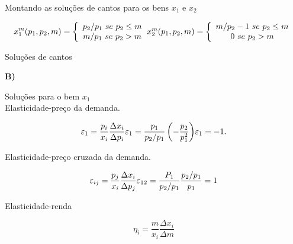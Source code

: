 \begin{flushleft}
\begin{center}
Montando as soluções de cantos para os bens $x_{1}$ e $x_{2}$
\end{center}

\begin{equation}
x_{1}^m(p_{1},p_{2},m) = \left\{
\begin{array}{cc}
p_{2}/p_{1} \ se \ p_{2} \leq m \\
m/p_{1} \ se \ p_{2} > m
\end{array}
\right.
$$\\$$
x_{2}^m(p_{1},p_{2},m) = \left\{
\begin{array}{cc}
m/p_{2} - 1 \ se \ p_{2} \leq m \\
0 \ se \ p_{2} > m
\end{array}
\right.
\end{equation}

\begin{center}
Soluções de cantos
\end{center}
\singlespacing

\textbf{B)} 
\singlespacing

\begin{center}
	Soluções para o bem $x_{1}$
	\\
	Elasticidade-preço da demanda.
\end{center}

\begin{equation}
\varepsilon_{1} = \dfrac{p_{i}}{x_{i}} \dfrac{ \Delta x_{i}}{\Delta p_{i}}
$$\\$$
\varepsilon_{1} = \dfrac{p_{1}}{p_{2}/p_{1}} \left(- \dfrac{p_{2}}{p_{1}^2} \right)
$$\\$$
\varepsilon_{1} = -1.
\end{equation}

\begin{center}
Elasticidade-preço cruzada da demanda.
\end{center}

\begin{equation}
\varepsilon_{ij} = \dfrac{p_{j}}{x_{i}} \dfrac{\Delta x_{i}}{\Delta p_{j}}
$$\\$$
\varepsilon_{12} = \dfrac{P_{1}}{p_{2}/p_{1}} \dfrac{p_{2}/p_{1}}{p_{1}} = 1
\end{equation}

\begin{center}
Elasticidade-renda 
\end{center}

\begin{equation}
\eta_{i} = \dfrac{m}{x_{i}} \dfrac{\Delta x_{i}}{\Delta m}
\end{equation}


\end{flushleft}
